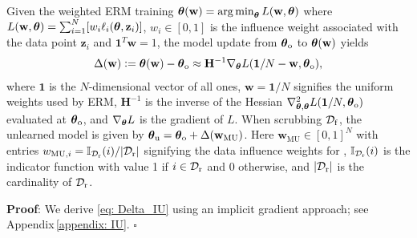 \begin{myprop}
\label{prop: IU}
Given the weighted ERM training $\boldsymbol{\theta}(\mathbf w) = \operatorname*{arg\,min}_{\boldsymbol{\theta}}
L(\mathbf w,\boldsymbol{\theta})
$ where $L(\mathbf w,\boldsymbol{\theta}) = \sum_{i=1}^N [w_i \ell_i (\boldsymbol{\theta}, \mathbf z_i)]$, 
$w_i \in [0,1]$ is the influence weight associated with the data point $\mathbf z_i$ and $\mathbf 1^T \mathbf w = 1$, 
the  model update from   $\boldsymbol \theta_\mathrm{o}$  to $\boldsymbol{\theta}(\mathbf w)$ yields %
{\small\begin{align}
   \hspace*{-2mm} \Delta(\mathbf w) \Def   \btheta(\mathbf w) - \thetafull \approx  \mathbf H^{-1} {\color{black}{  \nabla_{\btheta} L( \mathbf 1/N - \mathbf w, \thetafull)  }},  
  \hspace*{-2mm}
  \label{eq: Delta_IU}
\end{align}}%
where $\mathbf 1$ is the $N$-dimensional vector of all ones, {$\mathbf w=\mathbf{1}/N$ signifies the uniform weights used by ERM}, $\mathbf H^{-1} $ is the inverse of the Hessian    $\nabla^2_{\boldsymbol{\theta},\boldsymbol{\theta}} L(\mathbf 1/N,  \boldsymbol \theta_\mathrm{o})$ evaluated at $ \boldsymbol \theta_\mathrm{o}$, and $\nabla_{\boldsymbol{\theta}} L$ is the gradient of $L$. When scrubbing $\mathcal D_\mathrm{f}$, the unlearned model is given by
$\boldsymbol \theta_\mathrm{u} = \boldsymbol \theta_\mathrm{o} + \Delta(\mathbf{w}_\mathrm{MU})$. Here  
$\mathbf w_{\mathrm{MU}} \in [0, 1]^{N}$ with entries $w_{\mathrm{MU},i} = \mathbb{I}_{\mathcal D_\mathrm{r} } (i) / |\mathcal D_\mathrm{r}|$ signifying the data influence weights for {\MU}, %
$\mathbb{I}_{\mathcal D_\mathrm{r} } (i) $ is the indicator function with value 1 if $i \in \mathcal D_\mathrm{r} $ and 0 otherwise, and $|\mathcal D_\mathrm{r}|$ is the cardinality of $\mathcal D_\mathrm{r}$.
\end{myprop}
%
\textbf{Proof}: We derive \eqref{eq: Delta_IU}  using an implicit gradient approach;
see Appendix\,\ref{appendix: IU}.
\hfill $\square$


